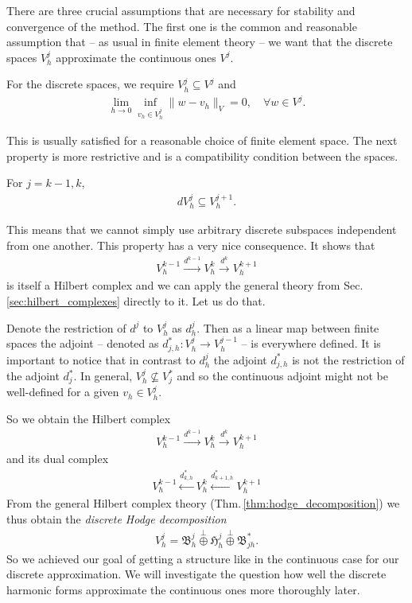 \documentclass[../master_thesis.tex]{subfiles}
\begin{document}
There are three crucial assumptions that are necessary for stability and convergence 
of the method. The first one is the common and reasonable assumption that 
-- as usual in finite element theory -- we want that the discrete spaces $V_h^j$
 approximate the continuous ones $V^j$. 
\begin{assumption}\label{ass:convergence_discrete_spaces}
    For the discrete spaces, we require $V_h^j \subseteq V^j$ and
    \begin{align*}
        \lim_{h \rightarrow 0} \inf_{v_h \in V_h^j} \lVert w - v_h \rVert _V= 0, \quad \forall w \in V^j.
    \end{align*}    
\end{assumption}
This is usually satisfied for a reasonable choice of finite element space.
The next property is more restrictive and is a compatibility condition between the spaces.

\begin{assumption}
    For $j = k-1, k$,
    \begin{align*}
        dV_h^j \subseteq V_h^{j+1}.
    \end{align*}    
\end{assumption}
This means that we cannot simply use arbitrary 
discrete subspaces independent from one another. This property has a very nice
consequence. 
It shows that 
\begin{align*}
    V_h^{k-1} \xrightarrow{d^{k-1}} V_h^k \xrightarrow{d^k} V_h^{k+1}
\end{align*}
is itself a Hilbert complex and we can apply the general theory from 
Sec. \ref{sec:hilbert_complexes} directly to it. Let us do that.

Denote the restriction of $d^j$ to $V_h^j$ as $d_h^j$. Then as a linear map 
between finite spaces the adjoint -- denoted as $d_{j,h}^*: V_h^j \rightarrow V_h^{j-1}$ -- 
is everywhere defined. It is important to notice that in contrast to $d^j_h$ 
the adjoint $d^*_{j,h}$ is not the restriction of the adjoint $d^*_j$.
In general, $V^j_h \not\subseteq V_j^*$ and so the continuous adjoint might not be 
well-defined for a given $v_h \in V^j_h$. 

So we obtain the Hilbert complex
\begin{align}
    V_h^{k-1} \xrightarrow{d^{k-1}} V_h^{k} \xrightarrow{d^{k}} V_h^{k+1}\label{eq:discrete_hilbert_complex}
\end{align}
and its dual complex
\begin{align*}
    V_h^{k-1} \xleftarrow{d^*_{k,h}} V_h^{k} \xleftarrow{d^*_{k+1,h}} V_h^{k+1}
\end{align*}
From the general Hilbert complex theory (Thm.\,\ref{thm:hodge_decomposition})
we thus obtain the \textit{discrete Hodge decomposition}
\begin{align*}
    V_h^j = \mathfrak{B}^j_h \stackrel{\perp}{\oplus} \mathfrak{H}^j_h \stackrel{\perp}{\oplus}
        \mathfrak{B}^*_{jh}.
\end{align*}
So we achieved our goal of getting a structure like in the continuous case 
for our discrete approximation. We  will investigate the question how well the discrete harmonic 
forms approximate the continuous ones more thoroughly later.
\end{document}

